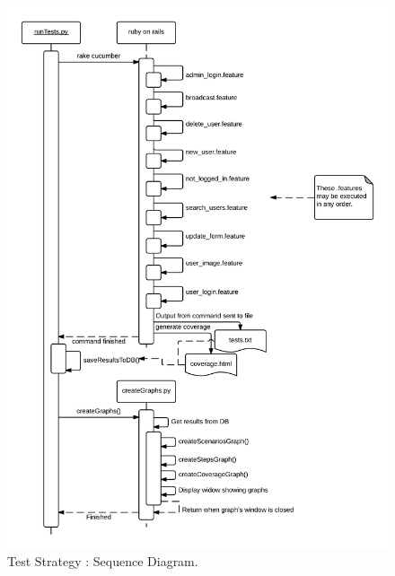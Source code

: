 \documentclass[10pt,a4paper,titlepage]{article}
\begin{document}
\begin{figure}[H]
\begin{center}
\includegraphics[scale=0.25]{include/Sequence_Diagram.png}  
\caption{Test Strategy : Sequence Diagram. }
\label{fig:sequenceDiagram}
\end{center}
\end{figure}
\end{document}
